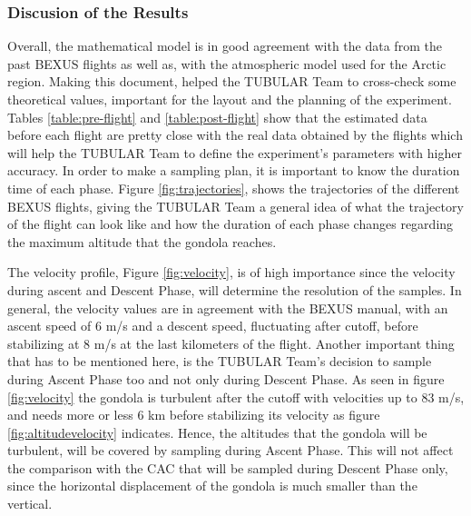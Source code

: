 \subsubsection{Discusion of the Results}
Overall, the mathematical model is in good agreement with the data from the past BEXUS flights as well as, with the atmospheric model used for the Arctic region.
Making this document, helped the TUBULAR Team to cross-check some theoretical values, important for the layout and the planning of the experiment. Tables \ref{table:pre-flight} and \ref{table:post-flight} show that the estimated data before each flight are pretty close with the real data obtained by the flights which will help the TUBULAR Team to define the experiment's parameters with higher accuracy. 
In order to make a sampling plan, it is important to know the duration time of each phase. Figure \ref{fig:trajectories}, shows the trajectories of the different BEXUS flights, giving the TUBULAR Team a general idea of what the trajectory of the flight can look like and how the duration of each phase changes regarding the maximum altitude that the gondola reaches.

The velocity profile, Figure \ref{fig:velocity}, is of high importance since the velocity during ascent and Descent Phase, will determine the resolution of the samples. In general, the velocity values are in agreement with the BEXUS manual, with an ascent speed of 6 m/s and a descent speed, fluctuating after cutoff, before stabilizing at 8 m/s at the last kilometers of the flight. Another important thing that has to be mentioned here, is the TUBULAR Team's decision to sample during Ascent Phase too and not only during Descent Phase. As seen in figure \ref{fig:velocity} the gondola is turbulent after the cutoff with velocities up to 83 m/s, and needs more or less 6 km before stabilizing its velocity as figure \ref{fig:altitudevelocity} indicates. Hence, the altitudes that the gondola will be turbulent, will be covered by sampling during Ascent Phase. This will not affect the comparison with the CAC that will be sampled during Descent Phase only, since the horizontal displacement of the gondola is much smaller than the vertical. 

